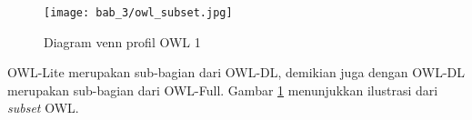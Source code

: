 \begin{figure}[ht]
	\centering
	\texttt{[image: bab\_3/owl\_subset.jpg]}
	\caption{Diagram venn profil OWL 1}
	\label{fig:owl_subset}
\end{figure}

OWL-Lite merupakan sub-bagian dari OWL-DL, demikian juga dengan OWL-DL merupakan sub-bagian dari OWL-Full. Gambar \ref{fig:owl_subset} menunjukkan ilustrasi dari \emph{subset} OWL.

